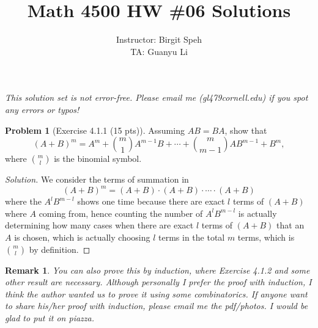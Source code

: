 \documentclass{article}
\title{Math 4500 HW \#06 Solutions}
\author{Instructor: Birgit Speh\\ TA: Guanyu Li}
\date{}
\theoremstyle{definition}
\newtheorem{problem}{Problem}
\theoremstyle{plain}
\newtheorem*{remark}{Remark}
\begin{document}
\maketitle\par

\emph{This solution set is not error-free. Please email me (gl479\MVAt cornell.edu) if you spot any errors or typos!}

\begin{problem}[Exercise 4.1.1 (15 pts)]Assuming $AB=BA$, show that
\begin{displaymath}
(A+B)^m=A^m+\binom{m}{1}A^{m-1}B+\cdots+\binom{m}{m-1}AB^{m-1}+B^m,
\end{displaymath}
where $\binom{m}{l}$ is the binomial symbol.
\end{problem}
\begin{adjustwidth}{0.7cm}{}
\color{blue}
\begin{proof}[Solution]
We consider the terms of summation in
\begin{displaymath}
(A+B)^m=(A+B)\cdot(A+B)\cdot\cdots\cdot(A+B)
\end{displaymath}
where the $A^lB^{m-l}$ shows one time because there are exact $l$ terms of $(A+B)$ where $A$ coming from, hence counting the number of $A^lB^{m-l}$ is actually determining how many cases when there are exact $l$ terms of $(A+B)$ that an $A$ is chosen, which is actually choosing $l$ terms in the total $m$ terms, which is $\binom{m}{l}$ by definition.
\color{black}
\end{proof}
\end{adjustwidth}
\begin{remark}
You can also prove this by induction, where Exercise 4.1.2 and some other result are necessary. Although personally I prefer the proof with induction, I think the author wanted us to prove it using some combinatorics. If anyone want to share his/her proof with induction, please email me the pdf/photos. I would be glad to put it on piazza.
\end{remark}
~\par
\end{document}
